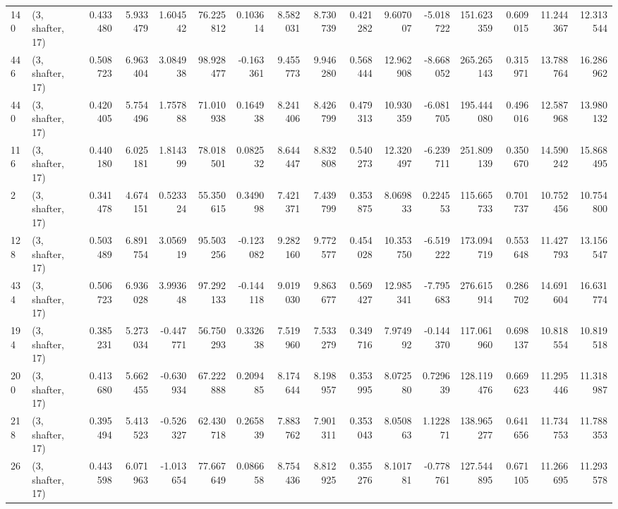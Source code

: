 \begin{tabular}{llrrrrrrrrrrrrrr}
140 &  (3, shafter, 17) &   0.433480 &   5.933479 &   1.604542 &    76.225812 &   0.103614 &   8.582031 &   8.730739 &  0.421282 &   9.607007 &  -5.018722 &   151.623359 &  0.609015 &  11.244367 &  12.313544 \\
446 &  (3, shafter, 17) &   0.508723 &   6.963404 &   3.084938 &    98.928477 &  -0.163361 &   9.455773 &   9.946280 &  0.568444 &  12.962908 &  -8.668052 &   265.265143 &  0.315971 &  13.788764 &  16.286962 \\
440 &  (3, shafter, 17) &   0.420405 &   5.754496 &   1.757888 &    71.010938 &   0.164938 &   8.241406 &   8.426799 &  0.479313 &  10.930359 &  -6.081705 &   195.444080 &  0.496016 &  12.587968 &  13.980132 \\
116 &  (3, shafter, 17) &   0.440180 &   6.025181 &   1.814399 &    78.018501 &   0.082532 &   8.644447 &   8.832808 &  0.540273 &  12.320497 &  -6.239711 &   251.809139 &  0.350670 &  14.590242 &  15.868495 \\
2   &  (3, shafter, 17) &   0.341478 &   4.674151 &   0.523324 &    55.350615 &   0.349098 &   7.421371 &   7.439799 &  0.353875 &   8.069833 &   0.224553 &   115.665733 &  0.701737 &  10.752456 &  10.754800 \\
128 &  (3, shafter, 17) &   0.503489 &   6.891754 &   3.056919 &    95.503256 &  -0.123082 &   9.282160 &   9.772577 &  0.454028 &  10.353750 &  -6.519222 &   173.094719 &  0.553648 &  11.427793 &  13.156547 \\
434 &  (3, shafter, 17) &   0.506723 &   6.936028 &   3.993648 &    97.292133 &  -0.144118 &   9.019030 &   9.863677 &  0.569427 &  12.985341 &  -7.795683 &   276.615914 &  0.286702 &  14.691604 &  16.631774 \\
194 &  (3, shafter, 17) &   0.385231 &   5.273034 &  -0.447771 &    56.750293 &   0.332638 &   7.519960 &   7.533279 &  0.349716 &   7.974992 &  -0.144370 &   117.061960 &  0.698137 &  10.818554 &  10.819518 \\
200 &  (3, shafter, 17) &   0.413680 &   5.662455 &  -0.630934 &    67.222888 &   0.209485 &   8.174644 &   8.198957 &  0.353995 &   8.072580 &   0.729639 &   128.119476 &  0.669623 &  11.295446 &  11.318987 \\
218 &  (3, shafter, 17) &   0.395494 &   5.413523 &  -0.526327 &    62.430718 &   0.265839 &   7.883762 &   7.901311 &  0.353043 &   8.050863 &   1.122871 &   138.965277 &  0.641656 &  11.734753 &  11.788353 \\
26  &  (3, shafter, 17) &   0.443598 &   6.071963 &  -1.013654 &    77.667649 &   0.086658 &   8.754436 &   8.812925 &  0.355276 &   8.101781 &  -0.778761 &   127.544895 &  0.671105 &  11.266695 &  11.293578 \\

\end{tabular}
